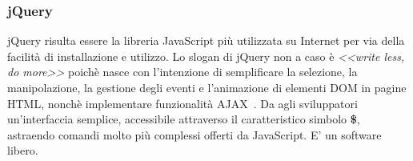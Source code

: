             \subsubsection{jQuery}
                jQuery risulta essere la libreria JavaScript più utilizzata su Internet per via della facilità di installazione e utilizzo.
                \newline
                Lo slogan di jQuery non a caso è \textit{<<write less, do more>>} poichè nasce con l'intenzione di semplificare la selezione, la manipolazione, la gestione degli eventi e l'animazione di elementi DOM in pagine HTML, nonchè implementare funzionalità AJAX~\cite{jquery}.
                \newline
                Da agli sviluppatori un'interfaccia semplice, accessibile attraverso il caratteristico simbolo \textbf{\$}, astraendo comandi molto più complessi offerti da JavaScript. E' un software libero.